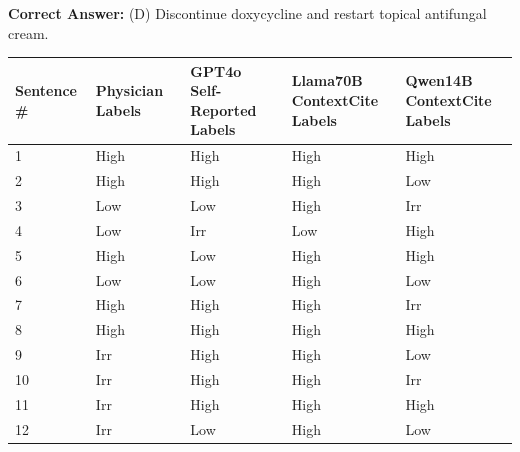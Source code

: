 \documentclass[11pt]{article}
\begin{document}
\begin{tcolorbox}[colback=blue!3!white, colframe=blue!50!white,
                  title=Example of QA Data (from JAMA QA ID1049), left=10mm, breakable]
\bigskip
\textbf{Correct Answer:} (D) Discontinue doxycycline and restart topical antifungal cream.

\bigskip
\noindent
\label{tab:label_landscape_comparison}

\medskip
\centering
\setlength{\tabcolsep}{4pt}
\begin{tabular}{|l|l|l|l|l|}
  \toprule
  Sentence \# & Physician Labels & \makecell[c]{GPT4o \\ Self-Reported Labels} & \makecell[c]{Llama70B \\ContextCite Labels}  & \makecell[c]{Qwen14B \\ContextCite Labels} \\
  \midrule
  1 & High & High & High & High\\
  2 & High  & High  & High & Low\\
  3 & Low  & Low & High & Irr\\
  4 & Low  & Irr  & Low  & High\\   
  5 & High & Low & High & High\\
  6 & Low  & Low  & High & Low\\
  7 & High  & High & High & Irr\\
  8 & High & High & High & High\\
  9 & Irr  & High  & High & Low\\
  10 & Irr  & High & High & Irr\\
  11 & Irr & High & High & High\\
  12 & Irr  & Low  & High & Low\\
  \bottomrule         
\end{tabular}
\end{tcolorbox}
\end{document}
